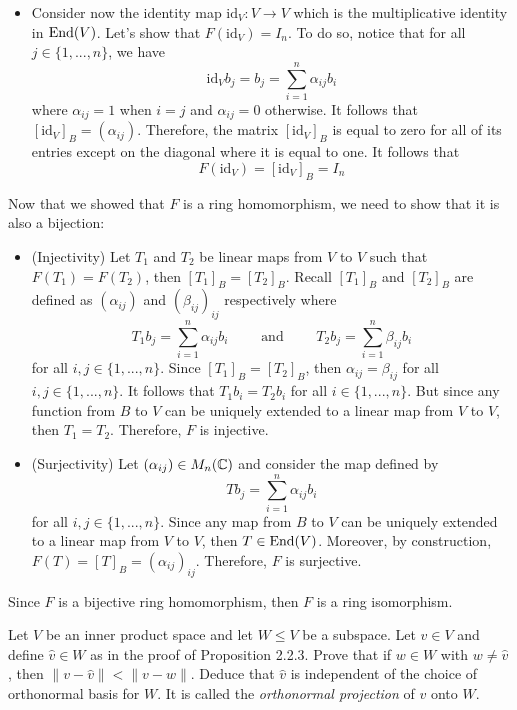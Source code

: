\begin{solution}
\begin{itemize}
        \item Consider now the identity map $\text{id}_V : V \to V$ which is the multiplicative identity in $\text{End}(V)$. Let's show that $F(\text{id}_V) = I_n$. To do so, notice that for all $j \in \{1, ..., n\}$, we have
        $$\text{id}_V b_j = b_j = \sum_{i=1}^{n}\alpha_{ij}b_i$$
        where $\alpha_{ij} = 1$ when $i=j$ and $\alpha_{ij} = 0$ otherwise. It follows that $[\text{id}_V]_B = (\alpha_{ij})$. Therefore, the matrix $[\text{id}_V]_B$ is equal to zero for all of its entries except on the diagonal where it is equal to one. It follows that
        $$F(\text{id}_V) = [\text{id}_V]_B = I_n$$
    \end{itemize}
    Now that we showed that $F$ is a ring homomorphism, we need to show that it is also a bijection:
    \begin{itemize}
        \item (Injectivity) Let $T_1$ and $T_2$ be linear maps from $V$ to $V$ such that $F(T_1) = F(T_2)$, then $[T_1]_B = [T_2]_B$. Recall $[T_1]_B$ and $[T_2]_B$ are defined as $(\alpha_{ij})$ and $(\beta_{ij})_{ij}$ respectively where
        $$T_1b_j = \sum_{i=1}^{n}\alpha_{ij}b_i \qquad \text{ and } \qquad T_2b_j = \sum_{i=1}^{n}\beta_{ij}b_i$$
        for all $i,j \in \{1,...,n\}$. Since $[T_1]_B = [T_2]_B$, then $\alpha_{ij} = \beta_{ij}$ for all $i,j \in \{1,...,n\}$. It follows that $T_1b_i = T_2b_i$ for all $i \in \{1, ..., n\}$. But since any function from $B$ to $V$ can be uniquely extended to a linear map from $V$ to $V$, then $T_1 = T_2$. Therefore, $F$ is injective.

        \item (Surjectivity) Let $(\alpha_{ij}) \in M_{n}(\mathbb{C})$ and consider the map defined by
        $$Tb_j = \sum_{i=1}^{n}\alpha_{ij}b_i$$
        for all $i,j \in \{1,...,n\}$. Since any map from $B$ to $V$ can be uniquely extended to a linear map from $V$ to $V$, then $T \in \text{End}(V)$. Moreover, by construction, $F(T) = [T]_B = (\alpha_{ij})_{ij}$. Therefore, $F$ is surjective. 
    \end{itemize}
    Since $F$ is a bijective ring homomorphism, then $F$ is a ring isomorphism. \\
\end{solution}

\begin{exercise}
    Let $V$ be an inner product space and let $W \leq V$ be a subspace. Let $v \in V$ and define $\hat{v} \in W$ as in the proof of Proposition 2.2.3. Prove that if $w \in W$ with $w \neq \hat{v}$, then $\|v - \hat{v}\| < \|v - w\|$. Deduce that $\hat{v}$ is independent of the choice of orthonormal basis for $W$. It is called the \textit{orthonormal projection} of $v$ onto $W$.\\
\end{exercise}

